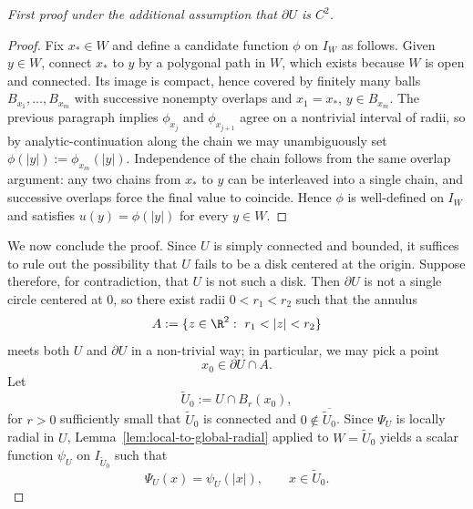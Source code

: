 \begin{proof}[First proof under the additional assumption that $\partial U$ is $C^2$]
\begin{proof}
Fix $x_*\in W$ and define a candidate function $\phi$ on $I_W$ as
follows. Given $y\in W$, connect $x_*$ to $y$ by a polygonal path in
$W$, which exists because $W$ is open and connected. Its image is
compact, hence covered by finitely many balls
$B_{x_1},\dots,B_{x_m}$ with successive nonempty overlaps and
$x_1=x_*$, $y\in B_{x_m}$. The previous paragraph implies $\phi_{x_j}$
and $\phi_{x_{j+1}}$ agree on a nontrivial interval of radii, so by
analytic-continuation along the chain we may unambiguously set
$\phi(|y|):=\phi_{x_m}(|y|)$. Independence of the chain follows from
the same overlap argument: any two chains from $x_*$ to $y$ can be
interleaved into a single chain, and successive overlaps force the
final value to coincide. Hence $\phi$ is well-defined on $I_W$ and
satisfies $u(y)=\phi(|y|)$ for every $y\in W$.
\end{proof}

We now conclude the proof. Since \(U\) is simply connected and bounded,
it suffices to rule out the possibility that \(U\) fails to be a disk
centered at the origin. Suppose therefore, for contradiction, that
\(U\) is not such a disk. Then \(\partial U\) is not a single circle
centered at $0$, so there exist radii \(0<r_1<r_2\) such that the
annulus
\[
A:=\{z\in \R^2:\ r_1<|z|<r_2\}
\]
meets both $U$ and $\partial U$ in a non-trivial way; in particular,
we may pick a point
\[
x_0\in \partial U\cap A.
\]
Let
\[
\widetilde{U}_0:=U\cap B_r(x_0),
\]
for $r>0$ sufficiently small that $\widetilde U_0$ is connected and
$0\notin \overline{\widetilde U_0}$. Since \(\Psi_U\) is locally radial
in \(U\), Lemma~\ref{lem:local-to-global-radial} applied to
$W=\widetilde U_0$ yields a scalar function \(\psi_U\) on
$I_{\widetilde U_0}$ such that
\[
\Psi_U(x)=\psi_U(|x|),\qquad x\in \widetilde{U}_0.
\]


\end{proof}
